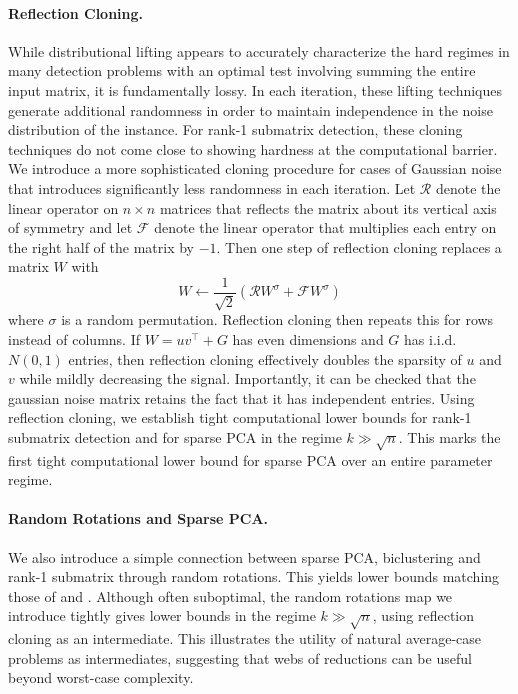 \paragraph{Reflection Cloning.} While distributional lifting appears to accurately characterize the hard regimes in many detection problems with an optimal test involving summing the entire input matrix, it is fundamentally lossy. In each iteration, these lifting techniques generate additional randomness in order to maintain independence in the noise distribution of the instance. For rank-1 submatrix detection, these cloning techniques do not come close to showing hardness at the computational barrier. We introduce a more sophisticated cloning procedure for cases of Gaussian noise that introduces significantly less randomness in each iteration. Let $\mathcal{R}$ denote the linear operator on $n \times n$ matrices that reflects the matrix about its vertical axis of symmetry and let $\mathcal{F}$ denote the linear operator that multiplies each entry on the right half of the matrix by $-1$. Then one step of reflection cloning replaces a matrix $W$ with
$$W \gets \frac{1}{\sqrt{2}} \left( \mathcal{R} W^\sigma + \mathcal{F} W^\sigma \right)$$
where $\sigma$ is a random permutation. Reflection cloning then repeats this for rows instead of columns. If $W = uv^\top + G$ has even dimensions and $G$ has i.i.d. $N(0, 1)$ entries, then reflection cloning effectively doubles the sparsity of $u$ and $v$ while mildly decreasing the signal. Importantly, it can be checked that the gaussian noise matrix retains the fact that it has independent entries.
Using reflection cloning, we establish tight computational lower bounds for rank-1 submatrix detection and for sparse PCA in the regime $k \gg \sqrt{n}$. This marks the first tight computational lower bound for sparse PCA over an entire parameter regime.

\paragraph{Random Rotations and Sparse PCA.} We also introduce a simple connection between sparse PCA, biclustering and rank-1 submatrix through random rotations. This yields lower bounds matching those of \cite{gao2017sparse} and \cite{berthet2013complexity}. Although often suboptimal, the random rotations map we introduce tightly gives lower bounds in the regime $k \gg \sqrt{n}$, using reflection cloning as an intermediate. This illustrates the utility of natural average-case problems as intermediates, suggesting that webs of reductions can be useful beyond worst-case complexity.

